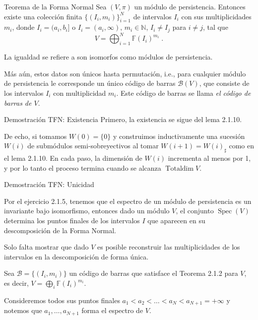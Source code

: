 \documentclass{beamer}
\DeclareMathOperator{\Spec}{Spec}
\DeclareMathOperator{\Totaldim}{Totaldim}
\newcommand{\calB}{{\mathcal{B}}}
\def\N{\mathbb{N}}
\def\F {\mathbb{F}}
\begin{document}
\begin{frame}{Teorema de la Forma Normal}
    Sea $(V,\pi)$ un módulo de persistencia. Entonces existe una colección finita $\{ (I_i, m_i) \}_{i=1}^N$ de intervalos $I_i$ con sus multiplicidades $m_i$, donde $I_i=(a_i,b_i]$ o $I_i = (a_i, \infty)$, $m_i \in \N$, $I_i \neq I_j$ para $i\neq j$,
	tal que
	$$
		V = \bigoplus_{i=1}^N \F(I_i)^{m_i} \;.
	$$
	\noindent

La igualdad se refiere a son isomorfos como módulos de persistencia. 
\noindent

Más aún, estos datos son únicos hasta permutación, i.e., para cualquier módulo de persistencia le corresponde un único código de barras $\calB (V)$, que consiste de los intervalos $I_i$ con multiplicidad $m_i$. Este código de barras se llama \emph{el código de barras de $V$}.
\end{frame}

\begin{frame}{Demostración TFN: Existencia}
Primero, la existencia se sigue del lema 2.1.10. \\[0.2cm] \pause
    
De echo, si tomamos $W(0)=\{0\}$ y construimos inductivamente una sucesión $W(i)$ de submódulos semi-sobreyectivos al tomar $W(i+1)=W(i)_{\sharp}$ como en el lema 2.1.10. En cada paso, la dimensión de $W(i)$ incrementa al menos por 1, y por lo tanto el proceso termina cuando se alcanza $\Totaldim V$.\\[0.2cm]
	
\end{frame}

\begin{frame}{Demostración TFN: Unicidad}

Por el ejercicio 2.1.5, tenemos que el espectro de un módulo de persistencia es un invariante bajo isomorfismo, entonces dado un módulo $V$, el conjunto $\Spec(V)$ determina los puntos finales de los intervalos $I$ que aparecen en su descomposición de la Forma Normal. \\[0.2cm] \pause

Solo falta mostrar que dado $V$ es posible reconstruir las multiplicidades de los intervalos en la descomposición de forma única. \\[0.2cm] \pause

Sea $\calB = \{ (I_i, m_i) \}$ un código de barras que satisface el Teorema 2.1.2 para $V$, es decir, $V = \bigoplus_i \F(I_i)^{m_i}$.\\[0.2cm] \pause
	
Consideremos todos sus puntos finales $a_1 < a_2 <\ldots < a_N < a_{N+1}=+\infty$ y notemos que $a_1, \ldots, a_{N+1}$ forma el espectro de $V$.
\end{frame}
\end{document}
